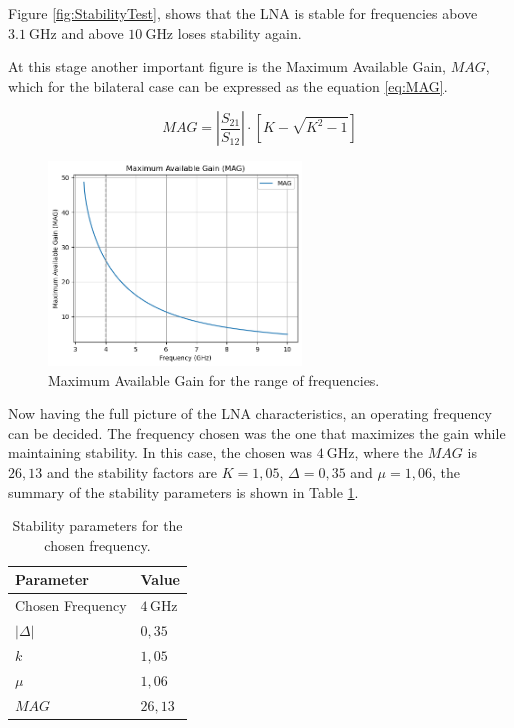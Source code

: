 Figure \ref{fig:StabilityTest}, shows that the LNA is stable for frequencies above $\SI{3.1}{\giga\hertz}$ and above $\SI{10}{\giga\hertz}$ loses stability again.

At this stage another important figure is the Maximum Available Gain, $MAG$, which for the bilateral case can be expressed as the equation \ref{eq:MAG}.

\begin{equation}
    MAG = \left | \frac{S_{21}}{S_{12}} \right |\cdot \left[ K - \sqrt{K^2-1} \right]
    \label{eq:MAG}
\end{equation}

\begin{figure}[H]
    \centering
    \includegraphics[width=0.6\textwidth]{Images/MAG.png}
    \caption{Maximum Available Gain for the range of frequencies.}  
    \label{fig:MAG}
\end{figure}

Now having the full picture of the LNA characteristics, an operating frequency can be decided. 
The frequency chosen was the one that maximizes the gain while maintaining stability. In this case, the chosen was $\SI{4}{\giga\hertz}$, where the $MAG$ is $26,13$ and the stability factors are $K=1,05$, $\Delta=0,35$ and $\mu=1,06$, the summary of the stability parameters is shown in Table \ref{tab:StabilityParam}.

\begin{table}[h]
    \centering
    \caption{Stability parameters for the chosen frequency.}
    \begin{tabularx}{\textwidth}{>{\centering\arraybackslash}X >{\centering\arraybackslash}X}
        \toprule
        \textbf{Parameter} & \textbf{Value} \\
        \midrule
        Chosen Frequency     & $4\,\si{\giga\hertz}$ \\
        \midrule
        $|\Delta|$     & $0,35$\\
        \midrule
        $k$   & $1,05$ \\
        \midrule
        $\mu$     & $1,06$ \\
        \midrule
        $MAG$  & $26,13$ \\
        \bottomrule
    \end{tabularx}
    \label{tab:StabilityParam}
\end{table}

